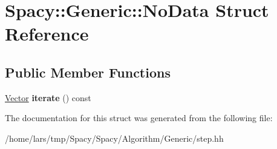 \hypertarget{structSpacy_1_1Generic_1_1NoData}{}\section{Spacy\+:\+:Generic\+:\+:No\+Data Struct Reference}
\label{structSpacy_1_1Generic_1_1NoData}
\subsection*{Public Member Functions}
\begin{DoxyCompactItemize}
\item 
\hyperlink{classSpacy_1_1Generic_1_1Vector}{Vector} {\bfseries iterate} () const \hypertarget{structSpacy_1_1Generic_1_1NoData_a2f6f7b1b8fba2eabe7dc36dca817b4a3}{}\label{structSpacy_1_1Generic_1_1NoData_a2f6f7b1b8fba2eabe7dc36dca817b4a3}

\end{DoxyCompactItemize}


The documentation for this struct was generated from the following file\+:\begin{DoxyCompactItemize}
\item 
/home/lars/tmp/\+Spacy/\+Spacy/\+Algorithm/\+Generic/step.\+hh\end{DoxyCompactItemize}
